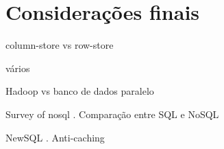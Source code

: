 \section{Considerações finais}
\label{sec:final}

column-store vs row-store \cite{Abadi2008}

vários \cite{Pavlo2009}

Hadoop vs banco de dados paralelo \cite{Stonebraker2010}

Survey of nosql \cite{han2011survey}. Comparação entre SQL e NoSQL 
\cite{cattell2011scalable, stonebraker2010sql}

NewSQL \cite{stonebraker2012newsql}. Anti-caching \cite{debrabant2013anti}
